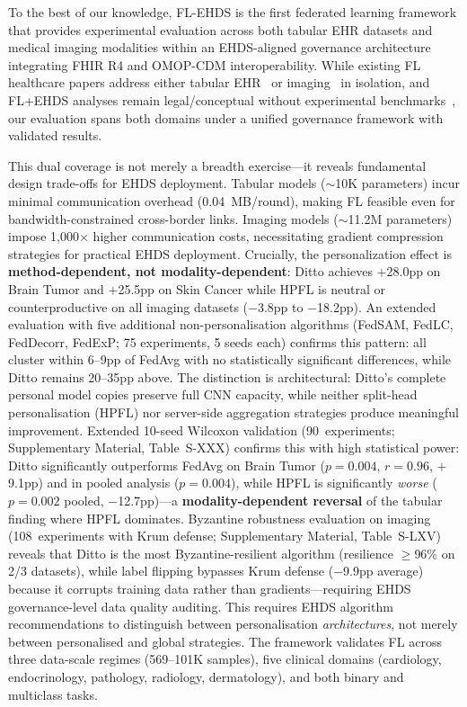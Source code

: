 \documentclass[conference,a4paper]{IEEEtran}
\begin{document}
To the best of our knowledge, FL-EHDS is the first federated learning framework that provides experimental evaluation across both tabular EHR datasets and medical imaging modalities within an EHDS-aligned governance architecture integrating FHIR R4 and OMOP-CDM interoperability. While existing FL healthcare papers address either tabular EHR~\cite{li2020federated} or imaging~\cite{sheller2020federated} in isolation, and FL+EHDS analyses remain legal/conceptual without experimental benchmarks~\cite{frohlich2025reality, vandrumpt2025pets}, our evaluation spans both domains under a unified governance framework with validated results.

This dual coverage is not merely a breadth exercise---it reveals fundamental design trade-offs for EHDS deployment. Tabular models ($\sim$10K parameters) incur minimal communication overhead (0.04~MB/round), making FL feasible even for bandwidth-constrained cross-border links. Imaging models ($\sim$11.2M parameters) impose 1,000$\times$ higher communication costs, necessitating gradient compression strategies for practical EHDS deployment. Crucially, the personalization effect is \textbf{method-dependent, not modality-dependent}: Ditto achieves $+$28.0pp on Brain Tumor and $+$25.5pp on Skin Cancer while HPFL is neutral or counterproductive on all imaging datasets ($-$3.8pp to $-$18.2pp). An extended evaluation with five additional non-personalisation algorithms (FedSAM, FedLC, FedDecorr, FedExP; 75 experiments, 5 seeds each) confirms this pattern: all cluster within 6--9pp of FedAvg with no statistically significant differences, while Ditto remains 20--35pp above. The distinction is architectural: Ditto's complete personal model copies preserve full CNN capacity, while neither split-head personalisation (HPFL) nor server-side aggregation strategies produce meaningful improvement. Extended 10-seed Wilcoxon validation (90~experiments; Supplementary Material, Table~S-XXX) confirms this with high statistical power: Ditto significantly outperforms FedAvg on Brain Tumor ($p{=}0.004$, $r{=}0.96$, $+$9.1pp) and in pooled analysis ($p{=}0.004$), while HPFL is significantly \textit{worse} ($p{=}0.002$ pooled, $-$12.7pp)---a \textbf{modality-dependent reversal} of the tabular finding where HPFL dominates. Byzantine robustness evaluation on imaging (108~experiments with Krum defense; Supplementary Material, Table~S-LXV) reveals that Ditto is the most Byzantine-resilient algorithm (resilience $\geq$96\% on 2/3 datasets), while label flipping bypasses Krum defense ($-$9.9pp average) because it corrupts training data rather than gradients---requiring EHDS governance-level data quality auditing. This requires EHDS algorithm recommendations to distinguish between personalisation \textit{architectures}, not merely between personalised and global strategies. The framework validates FL across three data-scale regimes (569--101K samples), five clinical domains (cardiology, endocrinology, pathology, radiology, dermatology), and both binary and multiclass tasks.
\end{document}
